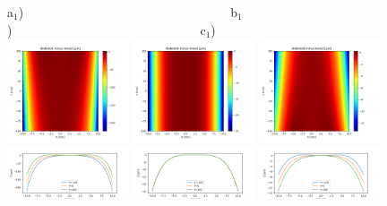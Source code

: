 \documentclass{iucr}              %
\begin{document}
\begin{figure}\label{fig:detrended}
\flushleft
a$_1$)~~~~~~~~~~~~~~~~~~~~~~~~~~~~~~~~~b$_1$)~~~~~~~~~~~~~~~~~~~~~~~~~~~~~~c$_1$)\\
\centering
\includegraphics[width=0.32\textwidth]{figures/diaboloid_detrended_1:5_image.png} 
\includegraphics[width=0.32\textwidth]{figures/diaboloid_detrended_1:2_image.png} 
\includegraphics[width=0.32\textwidth]{figures/diaboloid_detrended_1:1_image.png} \\
\includegraphics[width=0.32\textwidth]{figures/diaboloid_detrended_1:5_profile.png}
\includegraphics[width=0.32\textwidth]{figures/diaboloid_detrended_1:2_profile.png}
\includegraphics[width=0.32\textwidth]{figures/diaboloid_detrended_1:1_profile.png} \\

\end{figure}
\end{document}
